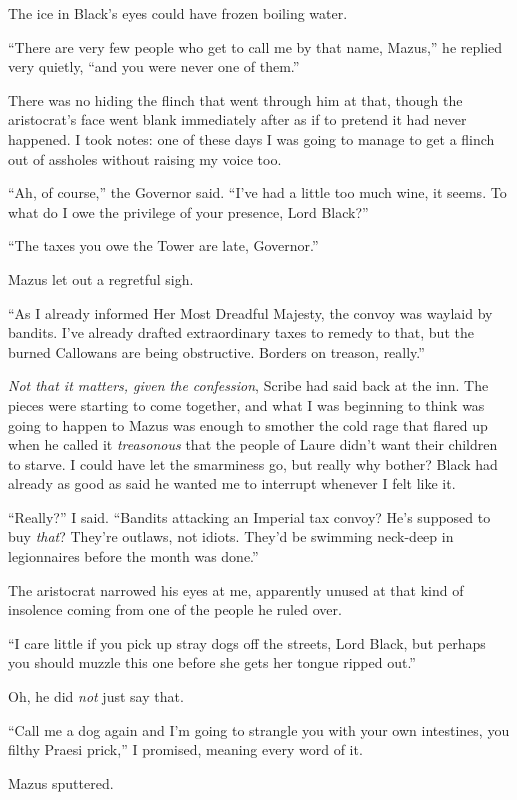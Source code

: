 \documentclass[12pt, openany]{book}
\begin{document}
The ice in Black’s eyes could have frozen boiling water.

“There are very few people who get to call me by that name, Mazus,” he replied very quietly, “and you were never one of them.”

There was no hiding the flinch that went through him at that, though the aristocrat’s face went blank immediately after as if to pretend it had never happened. I took notes: one of these days I was going to manage to get a flinch out of assholes without raising my voice too.

“Ah, of course,” the Governor said. “I’ve had a little too much wine, it seems. To what do I owe the privilege of your presence, Lord Black?”

“The taxes you owe the Tower are late, Governor.”

Mazus let out a regretful sigh.

“As I already informed Her Most Dreadful Majesty, the convoy was waylaid by bandits. I’ve already drafted extraordinary taxes to remedy to that, but the burned Callowans are being obstructive. Borders on treason, really.”

\textit{Not that it matters, given the confession}, Scribe had said back at the inn. The pieces were starting to come together, and what I was beginning to think was going to happen to Mazus was enough to smother the cold rage that flared up when he called it \textit{treasonous} that the people of Laure didn’t want their children to starve. I could have let the smarminess go, but really why bother? Black had already as good as said he wanted me to interrupt whenever I felt like it.

“Really?” I said. “Bandits attacking an Imperial tax convoy? He’s supposed to buy \textit{that}? They’re outlaws, not idiots. They’d be swimming neck-deep in legionnaires before the month was done.”

The aristocrat narrowed his eyes at me, apparently unused at that kind of insolence coming from one of the people he ruled over.

“I care little if you pick up stray dogs off the streets, Lord Black, but perhaps you should muzzle this one before she gets her tongue ripped out.”

Oh, he did \textit{not} just say that.

“Call me a dog again and I’m going to strangle you with your own intestines, you filthy Praesi prick,” I promised, meaning every word of it.

Mazus sputtered.
\end{document}
